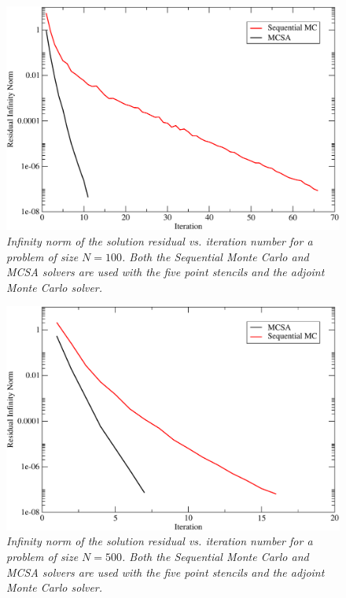 \documentclass[preprint,12pt]{elsarticle}
\begin{document}
\begin{figure}[ht!]
  \centering
  \includegraphics[width=5in,clip]{seq_conv_100.pdf}
  \caption{\sl Infinity norm of the solution residual vs. iteration
    number for a problem of size $N=100$. Both the Sequential Monte
    Carlo and MCSA solvers are used with the five point stencils and
    the adjoint Monte Carlo solver.}
  \label{fig:seq_100}
\end{figure}

\begin{figure}[ht!]
  \centering
  \includegraphics[width=5in,clip]{seq_conv_500.pdf}
  \caption{\sl Infinity norm of the solution residual vs. iteration
    number for a problem of size $N=500$. Both the Sequential Monte
    Carlo and MCSA solvers are used with the five point stencils and
    the adjoint Monte Carlo solver.}
  \label{fig:seq_500}
\end{figure}

\end{document}
